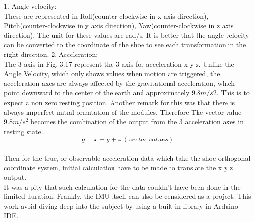 \documentclass[12 pt, a4paper]{thesis}
\begin{document}
1. Angle velocity:\\
These are represented in Roll(counter-clockwise in x axis direction), Pitch(counter-clockwise in y axis direction), Yaw(counter-clockwise in z axis direction). The unit for these values are rad/s. It is better that the angle velocity can be converted to the coordinate of the shoe to see each transformation in the right direction. 
2. Acceleration:\\
The 3 axis in Fig. 3.17 represent the 3 axis for acceleration x y z. Unlike the Angle Velocity, which only shows values when motion are triggered, the acceleration axes are always affected by the gravitational acceleration, which point downward to the center of the earth and approximately 9.8$m/s2$. This is to expect a non zero resting position. Another remark for this was that there is always imperfect initial orientation of the modules. Therefore The vector value $9.8m/s^2$ becomes the combination of the output from the 3 acceleration axes in resting state.\\
\begin{equation}
g = x+y+z \: (vector\: values)
\end{equation}  
\\
Then for the true, or observable acceleration data which take the shoe orthogonal coordinate system, initial calculation have  to be made to translate the x y z output.\\
It was a pity that such calculation for the data couldn't have been done in the limited duration. Frankly, the IMU itself can also be considered as a project. This work avoid diving deep into the subject by using a built-in library in Arduino IDE. 
\end{document}
